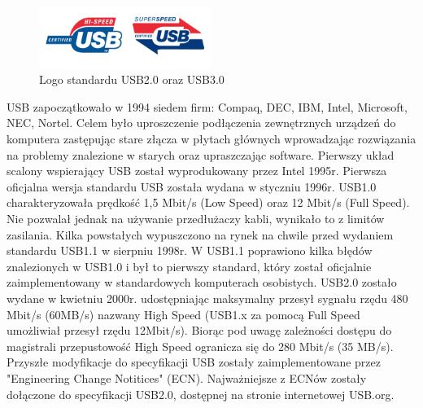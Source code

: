 \documentclass{BscUS}
\begin{document}
\begin{figure}[h]
\centering
\includegraphics[width=0.5\textwidth]{./img/usbLogo}
\caption{Logo standardu USB2.0 oraz USB3.0 \cite{usbLogo}}
\end{figure}
%
%
\indent USB zapoczątkowało w 1994 siedem firm: Compaq, DEC, IBM, Intel, Microsoft, NEC, Nortel. Celem było uproszczenie podłączenia zewnętrznych urządzeń do komputera zastępując stare złącza w płytach głównych wprowadzając rozwiązania na problemy znalezione w starych oraz upraszczając software.
Pierwszy układ scalony wspierający USB został wyprodukowany przez Intel 1995r.
\newline
\indent Pierwsza oficjalna wersja standardu USB została wydana w styczniu 1996r. USB1.0 charakteryzowała prędkość 1,5 Mbit/s (Low Speed) oraz 12 Mbit/s (Full Speed). Nie pozwalał jednak na używanie przedłużaczy kabli, wynikało to z limitów zasilania. %
Kilka powstałych wypuszczono na rynek na chwile przed wydaniem standardu USB1.1 w sierpniu 1998r. W USB1.1 poprawiono kilka błędów znalezionych w USB1.0 i był to pierwszy standard, który został oficjalnie zaimplementowany w standardowych komputerach osobistych. \cite{USBSystemArch}
\newline
\indent USB2.0 zostało wydane w kwietniu 2000r. udostępniając maksymalny przesył sygnału rzędu 480 Mbit/s (60MB/s) nazwany High Speed (USB1.x za pomocą Full Speed umożliwiał przesył rzędu 12Mbit/s). Biorąc pod uwagę zależności dostępu do magistrali przepustowość High Speed ogranicza się do 280 Mbit/s (35 MB/s).
Przyszłe modyfikacje do specyfikacji USB zostały zaimplementowane przez "Engineering Change Notitices" (ECN). Najważniejsze z ECNów zostały dołączone do specyfikacji USB2.0, dostępnej na stronie internetowej USB.org.
\end{document}
